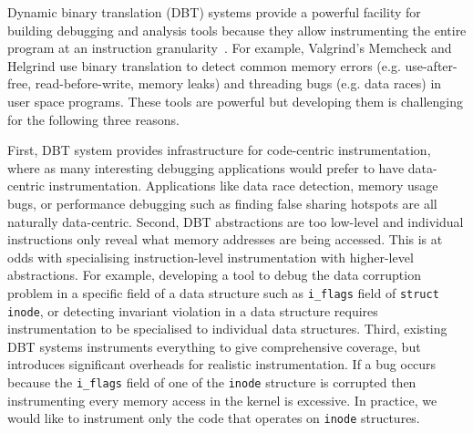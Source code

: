 \documentclass[letterpaper,twocolumn,10pt]{article}
\begin{document}
Dynamic binary translation (DBT) systems provide a powerful facility for building debugging and analysis tools because they allow instrumenting the entire program at an instruction granularity~\cite{DynamoRIOKernel}. For example, Valgrind's Memcheck \cite{Seward:2005:UVD:1247360.1247362} and Helgrind \cite{Muehlenfeld:2007:FDM:1229428.1229457} use binary translation to detect common memory errors (e.g. use-after-free, read-before-write, memory leaks) and threading bugs (e.g. data races) in user space programs. These tools are powerful but developing them is challenging for the following three reasons.

First, DBT system provides infrastructure for code-centric instrumentation, where as many interesting debugging applications would prefer to have data-centric instrumentation. Applications like data race detection, memory usage bugs, or performance debugging such as finding false sharing hotspots are all naturally data-centric.
%
Second, DBT abstractions are too low-level and individual instructions only reveal what memory addresses are being accessed. This is at odds with specialising instruction-level instrumentation with higher-level abstractions. For example, developing a tool to debug the data corruption problem in a specific field of a data structure such as \texttt{i\_flags} field of \texttt{struct inode}, or detecting invariant violation in a data structure requires instrumentation to be specialised to individual data structures.
Third, existing DBT systems instruments everything to give comprehensive coverage, but introduces significant overheads for realistic instrumentation. If a bug occurs because the \texttt{i\_flags} field of one of the \texttt{inode} structure is corrupted then instrumenting every memory access in the kernel is excessive. In practice, we would like to instrument only the code that operates on \texttt{inode} structures.


\end{document}
